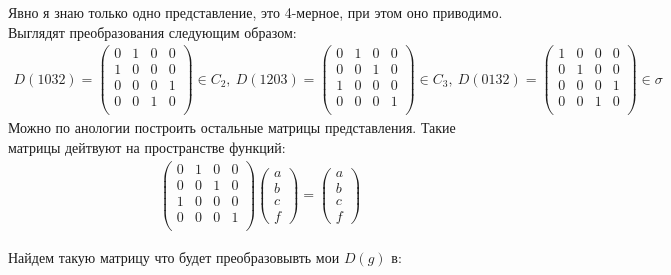 Явно я знаю только одно представление, это 4-мерное, при этом оно приводимо.
Выглядят преобразования следующим образом:
\begin{gather}
    D(1032)=
    \begin{pmatrix}
        0& 1& 0& 0\\
        1& 0& 0& 0\\
        0& 0& 0& 1\\
        0& 0& 1& 0\\
    \end{pmatrix}
    \in C_2, \
    D(1203)=
    \begin{pmatrix}
        0& 1& 0& 0\\
        0& 0& 1& 0\\
        1& 0& 0& 0\\
        0& 0& 0& 1\\
    \end{pmatrix}
    \in C_3, \
    D(0132)=
    \begin{pmatrix}
        1& 0& 0& 0\\
        0& 1& 0& 0\\
        0& 0& 0& 1\\
        0& 0& 1& 0\\
    \end{pmatrix}
    \in \sigma
\end{gather}
Можно по анологии построить остальные матрицы представления. Такие матрицы дейтвуют на пространстве
функций:
\begin{gather}
    \begin{pmatrix}
        0& 1& 0& 0\\
        0& 0& 1& 0\\
        1& 0& 0& 0\\
        0& 0& 0& 1\\
    \end{pmatrix}
    \begin{pmatrix}
        a\\ b\\ c\\ f
    \end{pmatrix}
    =
    \begin{pmatrix}
        a\\ b\\ c\\ f
    \end{pmatrix}
\end{gather}

Найдем такую матрицу что будет преобразовывть мои $D(g)$ в:

